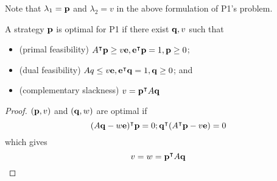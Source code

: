 Note that \( \vb \lambda_1 = \vb p \) and \( \lambda_2 = v \) in the above formulation of P1's problem.
\begin{theorem}
	A strategy \( \vb p \) is optimal for P1 if there exist \( \vb q, v \) such that
	\begin{itemize}
		\item (primal feasibility) \( A^\intercal \vb p \geq v \vb e, \vb e^\intercal \vb p = 1, \vb p \geq 0 \);
		\item (dual feasibility) \( Aq \leq v\vb e, \vb e^\intercal \vb q = 1, \vb q \geq 0 \); and
		\item (complementary slackness) \( v = \vb p^\intercal A \vb q \)
	\end{itemize}
\end{theorem}
\begin{proof}
	\( (\vb p, v) \) and \( (\vb q, w) \) are optimal if
	\[
		(A \vb q - w \vb e)^\intercal \vb p = 0; \vb q^\intercal(A^\intercal \vb p - v \vb e) = 0
	\]
	which gives
	\[
		v = w = \vb p^\intercal A \vb q
	\]
\end{proof}

